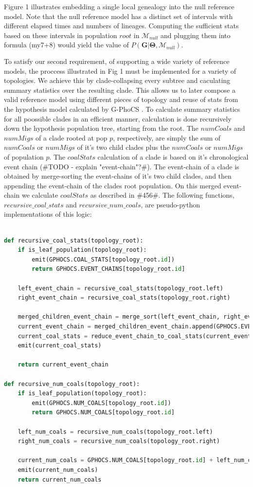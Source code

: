 \documentclass[11pt]{article}
\newcommand{\vect}[1]{\boldsymbol{\mathbf{#1}}}
\newcommand{\M}{\mathcal{M}}
\newcommand{\G}{\vect{G}}
\newcommand{\T}{\vect{\Theta}}
\newcommand{\Mnull}{\M_{null}}
\newcommand{\1}{\mathbbm{1}}
\newcommand{\gp}{G-PhoCS }
\begin{document}
Figure 1 illustrates embedding a single local genealogy into the null reference model. Note that the null reference model has a distinct set of intervals with different elapsed times and numbers of lineages. Computing the sufficient stats based on these intervals in population $root$  in $\Mnull$ and plugging them into formula (my7+8) would yield the value of $P(\G| \T,\Mnull)$.

To satisfy our second requirement, of supporting a wide variety of reference models, the proccess illustrated in Fig 1 must be implemented for a variety of topologies. We achieve this by clade-collapsing every subtree and caculating summary statistics over the resulting clade. This allows us to later compose a valid reference model using different pieces of topology and reuse of stats from the hypothesis model calculated by \gp.
%
To calculate summary statistics for all poossible clades in an efficient manner, calculation is done recursively down the hypothesis population tree, starting from the root. The $numCoals$ and $numMigs$ of a clade rooted at pop $p$, respectively, are simply the sum of $numCoals$ or $numMigs$ of it's two child clades plus the $numCoals$ or $numMigs$ of population $p$.
%
The $coalStats$ calculation of a clade is based on it's chronological event chain (\#TODO - explain "event-chain"?\#). The event-chain of a clade is obtained by merge-sorting the event-chains of it's two child clades, and then appending the event-chain of the clades root population. On this merged event-chain we calculate $coalStats$ as described in \#456\#. The following functions, $recursive\_coal\_stats$ and $recursive\_num\_coals$, are pseudo-python implementations of this logic:
%
\begin{lstlisting}[language=Python]

def recursive_coal_stats(topology_root):
    if is_leaf_population(topology_root):
        emit(GPHOCS.COAL_STATS[topology_root.id])
        return GPHOCS.EVENT_CHAINS[topology_root.id]

    left_event_chain = recursive_coal_stats(topology_root.left)
    right_event_chain = recursive_coal_stats(topology_root.right)

    merged_children_event_chain = merge_sort(left_event_chain, right_event_chain)
    current_event_chain = merged_children_event_chain.append(GPHOCS.EVENT_CHAINS[topology_root.id])
    current_coal_stats = reduce_event_chain_to_coal_stats(current_event_chain)
    emit(current_coal_stats)

    return current_event_chain

def recursive_num_coals(topology_root):
    if is_leaf_population(topology_root):
        emit(GPHOCS.NUM_COALS[topology_root.id])
        return GPHOCS.NUM_COALS[topology_root.id]

    left_num_coals = recursive_num_coals(topology_root.left)
    right_num_coals = recursive_num_coals(topology_root.right)

    current_num_coals = GPHOCS.NUM_COALS[topology_root.id] + left_num_coals + right_num_coals
    emit(current_num_coals)
    return current_num_coals

\end{lstlisting}
\end{document}
